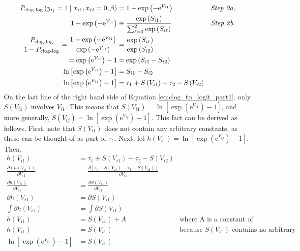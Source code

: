 \begin{equation}
\label{eq:clog_to_logit_part1}
\begin{aligned}
P_{\textrm{clog-log}} \left( y_{ij} = 1 \mid x_{i1}, x_{i2} = 0, \beta \right) &= 1 - \exp \left( - \mathrm{e}^{V_{i1}} \right) \qquad &\textrm{\textit{Step 2a.}}\\ 
1 - \exp \left( - \mathrm{e}^{V_{i1}} \right) &\equiv \frac{\exp \left( S_{i1} \right)}{\sum _{\ell = 1} ^2 \exp \left( S_{i \ell} \right)}  \qquad &\textrm{\textit{Step 2b.}}\\
\frac{P_{\textrm{clog-log}}}{1 - P_{\textrm{clog-log}}} = \frac{1 - \exp \left( - \mathrm{e}^{V_{i1}} \right)}{\exp \left( - \mathrm{e}^{V_{i1}} \right)} &= \frac{\exp \left( S_{i1} \right)}{\exp \left( S_{i2} \right)} \\
= \exp \left( \mathrm{e}^{V_{i1}} \right) - 1 &= \exp \left( S_{i1} - S_{i2} \right)\\
\ln \left[ \exp \left( \mathrm{e}^{V_{i1}} \right) - 1 \right] &= S_{i1} - S_{i2} \\
\ln \left[ \exp \left( \mathrm{e}^{V_{i1}} \right) - 1 \right]  &= \tau_1 + S \left( V_{i1} \right) - \tau_2 - S \left( V_{i2} \right)
\end{aligned}
\end{equation}
On the last line of the right hand side of Equation \ref{eq:clog_to_logit_part1}, only $S \left( V_{i1} \right)$ involves $V_{i1}$. This means that $S \left( V_{i1} \right) = \ln \left[ \exp \left( \mathrm{e}^{V_{i1}} \right) - 1 \right]$, and more generally, $S \left( V_{ij} \right) = \ln \left[ \exp \left( \mathrm{e}^{V_{ij}} \right) - 1 \right]$. This fact can be derived as follows. First, note that $S \left( V_{i1} \right)$ does not contain any arbitrary constants, as these can be thought of as part of $\tau_1$. Next, let $h \left(V_{i1} \right) = \ln \left[ \exp \left( \mathrm{e}^{V_{ij}} \right) - 1 \right]$. Then,
\begin{equation*}
\begin{aligned}
h \left(V_{i1} \right) &= \tau_1 + S \left( V_{i1} \right) - \tau_2 - S \left( V_{i2} \right) \\
\frac{\partial \left( h \left( V_{i1} \right) \right)}{\partial V_{i1}} &= \frac{\partial \left[ \tau_1 + S \left( V_{i1} \right) - \tau_2 - S \left( V_{i2} \right) \right]}{\partial V_{i1}} \\
\frac{\partial h \left( V_{i1} \right) }{\partial V_{i1}} &= \frac{\partial S \left( V_{i1} \right)}{\partial V_{i1}} \\
\partial h \left( V_{i1} \right) &= \partial S \left( V_{i1} \right) \\
\int \partial h \left( V_{i1} \right) &= \int \partial S \left( V_{i1} \right) \\
h \left( V_{i1} \right) &= S \left( V_{i1} \right) + A \  &\textrm{where A is a constant of integration} \\
h \left( V_{i1} \right) &= S \left( V_{i1} \right) \ &\textrm{because $S \left( V_{i1} \right)$ contains no arbitrary constants} \\
\ln \left[ \exp \left( \mathrm{e}^{V_{i1}} \right) - 1 \right] &= S \left( V_{i1} \right)
\end{aligned}
\end{equation*}

